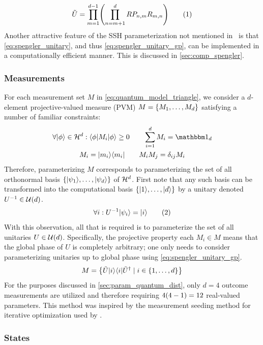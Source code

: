 \documentclass[aps, 10pt, english, twoside, pra, nofootinbib, tightenlines, longbibliography]{revtex4-1}
\begin{document}
    \[ \ti U = \prod_{m=1}^{d-1} \br{\prod_{n=m+1}^{d} RP_{n,m}R_{m,n}} \eq \label{eq:spengler_unitary_gp} \]
    Another attractive feature of the SSH parameterization not mentioned in~\cite{Spengler_2010_Unitary} is that \cref{eq:spengler_unitary}, and thus \cref{eq:spengler_unitary_gp}, can be implemented in a computationally efficient manner. This is discussed in \cref{sec:comp_spengler}.
    \subsubsection{Measurements}
    \label{sec:measurements}
    For each measurement set $M$ in \cref{eq:quantum_model_triangle}, we consider a $d$-element projective-valued measure (PVM) $M = \bc{M_1, \ldots, M_d}$ satisfying a number of familiar constraints:
    \begin{gather*}
    \forall \ket{\phi} \in \Hilb^d: \bra{\phi} M_i \ket{\phi} \geq 0 \qquad \sum_{i=1}^{d} M_i = \ident_{d} \\
    M_i = \ket{m_i}\bra{m_i} \qquad M_i M_j = \de_{ij} M_i
    \end{gather*}
    Therefore, parameterizing $M$ corresponds to parameterizing the set of all orthonormal basis $\bc{\ket{\psi_1}, \ldots, \ket{\psi_d}}$ of $\mathcal{H}^d$.
    First note that any such basis can be transformed into the computational basis $\bc{\ket{1}, \ldots, \ket{d}}$ by a unitary denoted $U^{-1} \in \mathcal{U}\br{d}$.
    \[ \forall i : U^{-1} \ket{\psi_i} = \ket{i} \eq \label{eq:unitary_transform}\]
    With this observation, all that is required is to parameterize the set of all unitaries $U \in \mathcal{U}\br{d}$. Specifically, the projective property each $M_i \in M$ means that the global phase of $U$ is completely arbitrary; one only needs to consider parameterizing unitaries up to global phase using \cref{eq:spengler_unitary_gp}.
    \[ M = \bc{\ti U \ket{i} \bra{i} \ti U^{\dagger} \mid i \in \bc{1, \ldots, d}} \]
    For the purposes discussed in \cref{sec:param_quantum_dist}, only $d = 4$ outcome measurements are utilized and therefore requiring $4\br{4 - 1} = 12$ real-valued parameters. This method was inspired by the measurement seeding method for iterative optimization used by \citet{Pal_2010} .
    \subsubsection{States}
    \label{sec:states}
\end{document}
